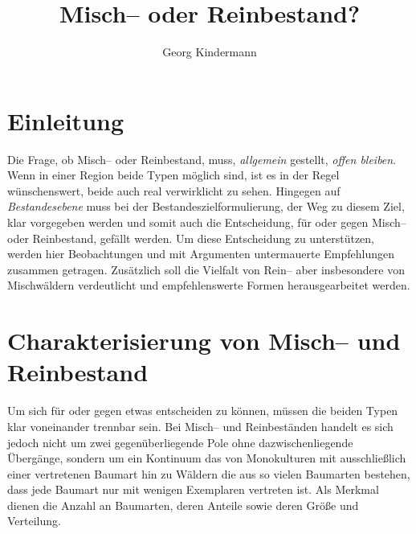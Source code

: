 \documentclass[twocolumn]{scrartcl}
\title{Misch-- oder Reinbestand?}
\author{Georg Kindermann}
\begin{document}

\tableofcontents

\section{Einleitung}

Die Frage, ob Misch-- oder Reinbestand, muss, \emph{allgemein}
gestellt, \emph{offen bleiben}. Wenn in einer Region beide Typen
möglich sind, ist es in der Regel wünschenswert, beide auch real
verwirklicht zu sehen. Hingegen auf \emph{Bestandesebene} muss bei der
Bestandeszielformulierung, der Weg zu diesem Ziel, klar vorgegeben
werden und somit auch die Entscheidung, für oder gegen Misch-- oder
Reinbestand, gefällt werden. Um diese Entscheidung zu unterstützen,
werden hier Beobachtungen und mit Argumenten untermauerte Empfehlungen
zusammen getragen. Zusätzlich soll die Vielfalt von Rein-- aber
insbesondere von Mischwäldern verdeutlicht und empfehlenswerte Formen
herausgearbeitet werden.

\section{Charakterisierung von Misch-- und Reinbestand}
\label{sec:charakterisierung}

Um sich für oder gegen etwas entscheiden zu können, müssen die beiden
Typen klar voneinander trennbar sein. Bei Misch-- und Reinbeständen
handelt es sich jedoch nicht um zwei gegenüberliegende Pole ohne
dazwischenliegende Übergänge, sondern um ein Kontinuum das von
Monokulturen mit ausschließlich einer vertretenen Baumart hin zu
Wäldern die aus so vielen Baumarten bestehen, dass jede Baumart nur
mit wenigen Exemplaren vertreten ist. Als Merkmal dienen die Anzahl an
Baumarten, deren Anteile sowie deren Größe und Verteilung.
\end{document}

